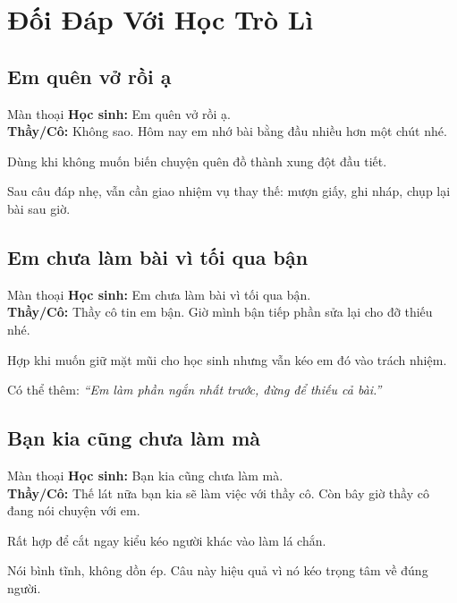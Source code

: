 \chapter{Đối Đáp Với Học Trò Lì}

\section{Em quên vở rồi ạ}
\begin{manthoai}{Màn thoại}
\textbf{Học sinh:} Em quên vở rồi ạ.\\
\textbf{Thầy/Cô:} Không sao. Hôm nay em nhớ bài bằng đầu nhiều hơn một chút nhé.
\end{manthoai}
\begin{dungkhinào}
Dùng khi không muốn biến chuyện quên đồ thành xung đột đầu tiết.
\end{dungkhinào}
\begin{nhipthem}
Sau câu đáp nhẹ, vẫn cần giao nhiệm vụ thay thế: mượn giấy, ghi nháp, chụp lại bài sau giờ.
\end{nhipthem}
\ngancach

\section{Em chưa làm bài vì tối qua bận}
\begin{manthoai}{Màn thoại}
\textbf{Học sinh:} Em chưa làm bài vì tối qua bận.\\
\textbf{Thầy/Cô:} Thầy cô tin em bận. Giờ mình bận tiếp phần sửa lại cho đỡ thiếu nhé.
\end{manthoai}
\begin{dungkhinào}
Hợp khi muốn giữ mặt mũi cho học sinh nhưng vẫn kéo em đó vào trách nhiệm.
\end{dungkhinào}
\begin{nhipthem}
Có thể thêm: \textit{``Em làm phần ngắn nhất trước, đừng để thiếu cả bài.''}
\end{nhipthem}
\ngancach

\section{Bạn kia cũng chưa làm mà}
\begin{manthoai}{Màn thoại}
\textbf{Học sinh:} Bạn kia cũng chưa làm mà.\\
\textbf{Thầy/Cô:} Thế lát nữa bạn kia sẽ làm việc với thầy cô. Còn bây giờ thầy cô đang nói chuyện với em.
\end{manthoai}
\begin{dungkhinào}
Rất hợp để cắt ngay kiểu kéo người khác vào làm lá chắn.
\end{dungkhinào}
\begin{nhipthem}
Nói bình tĩnh, không dồn ép. Câu này hiệu quả vì nó kéo trọng tâm về đúng người.
\end{nhipthem}
\ngancach

